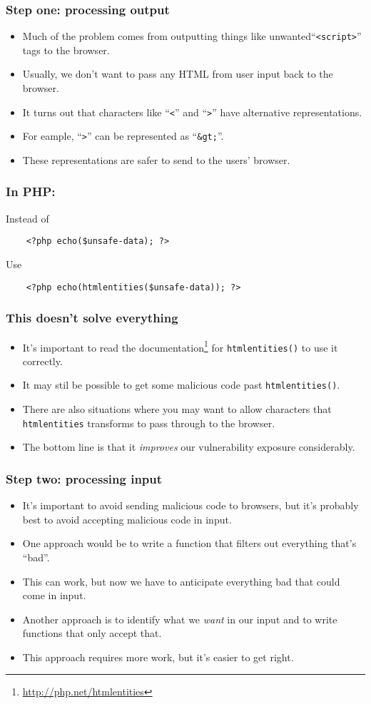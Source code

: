 \documentclass[10pt]{beamer}
\begin{document}
\begin{frame}
	\frametitle{Step one: processing output}

	\begin{itemize}
		\item Much of the problem comes from outputting things
			like unwanted``\texttt{<script>}'' tags to the browser.
		\item Usually, we don't want to pass any HTML from user input
			back to the browser.
		\item It turns out that characters like ``\texttt{<}'' and
			``\texttt{>}'' have alternative representations.
		\item For eample, ``\texttt{>}'' can be represented as 
			``\texttt{\&gt;}''.
		\item These representations are safer to send to the users' browser.
	\end{itemize}
\end{frame}
\begin{frame}[fragile]
	\frametitle{In PHP:}
	Instead of 
	\begin{verbatim}
    <?php echo($unsafe-data); ?> 
	\end{verbatim}
	Use
	\begin{verbatim}
    <?php echo(htmlentities($unsafe-data)); ?> 
	\end{verbatim}
\end{frame}
\begin{frame}
	\frametitle{This doesn't solve everything}
	\begin{itemize}
		\item It's important to read the documentation\footnote{\url{http://php.net/htmlentities}} for \texttt{htmlentities()} to use it correctly.
		\item It may stil be possible to get some malicious code past
			\texttt{htmlentities()}.
		\item There are also situations where you may want to allow 
			characters that \texttt{htmlentities} transforms to
			pass through to the browser.
		\item The bottom line is that it \emph{improves} our vulnerability 
			exposure considerably.
	\end{itemize}
\end{frame}
\begin{frame}
	\frametitle{Step two: processing input}
	\begin{itemize}
		\item It's important to avoid sending malicious code to 
			browsers, but it's probably best to avoid accepting
			malicious code in input.
		\item One approach would be to write a function that filters 
			out everything that's ``bad''.
		\item This can work, but now we have to anticipate everything
			bad that could come in input.
		\item Another approach is to identify what we \emph{want} in 
			our input and to write functions that only accept that.
		\item This approach requires more work, but it's easier to get
			right.
	\end{itemize}
\end{frame}
\end{document}
